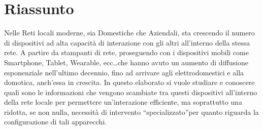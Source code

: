 
\chapter*{Riassunto}

Nelle Reti locali moderne, sia Domestiche che Aziendali, sta crescendo il numero di dispositivi ad alta capacità di interazione con gli altri all'interno della stessa rete. A partire da stampanti di rete, proseguendo con i dispositivi mobili come Smartphone, Tablet, Wearable, ecc\dots \space che hanno avuto un aumento di diffusione esponenziale nell'ultimo decennio, fino ad arrivare agli elettrodomestici e alla domotica, anch'essa in crescita. In questo elaborato si vuole studiare e conoscere quali sono le informazioni che vengono scambiate tra questi dispositivi all'interno della rete locale per permettere un'interazione efficiente, ma soprattutto una ridotta, se non nulla, necessità di intervento \textquotedblleft specializzato\textquotedblright \space per quanto riguarda la configurazione di tali apparecchi.